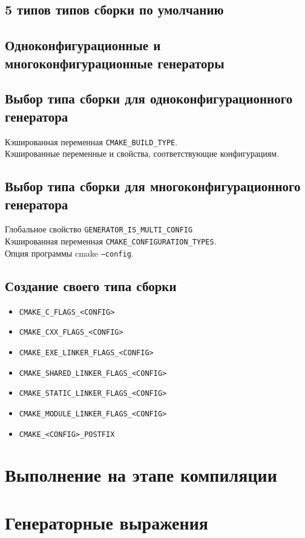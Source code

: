 \documentclass{article}
\begin{document}
\subsection*{5 типов типов сборки по умолчанию}
\subsection*{Одноконфигурационные и многоконфигурационные генераторы}

\subsection*{Выбор типа сборки для одноконфигурационного генератора}
Кэшированная переменная \texttt{CMAKE\_BUILD\_TYPE}.\\
Кэшированные переменные и свойства, соответствующие конфигурациям.\\


\subsection*{Выбор типа сборки для многоконфигурационного генератора}
Глобальное свойство \texttt{GENERATOR\_IS\_MULTI\_CONFIG}\\
Кэшированная переменная \texttt{CMAKE\_CONFIGURATION\_TYPES}.\\
Опция программы cmake \texttt{--config}.\\


\subsection*{Создание своего типа сборки}
\begin{itemize}
\item \texttt{CMAKE\_C\_FLAGS\_<CONFIG>}
\item \texttt{CMAKE\_CXX\_FLAGS\_<CONFIG>}
\item \texttt{CMAKE\_EXE\_LINKER\_FLAGS\_<CONFIG>}
\item \texttt{CMAKE\_SHARED\_LINKER\_FLAGS\_<CONFIG>}
\item \texttt{CMAKE\_STATIC\_LINKER\_FLAGS\_<CONFIG>}
\item \texttt{CMAKE\_MODULE\_LINKER\_FLAGS\_<CONFIG>}
\item \texttt{CMAKE\_<CONFIG>\_POSTFIX}
\end{itemize}



\section{Выполнение на этапе компиляции}

\section{Генераторные выражения}
\end{document}
